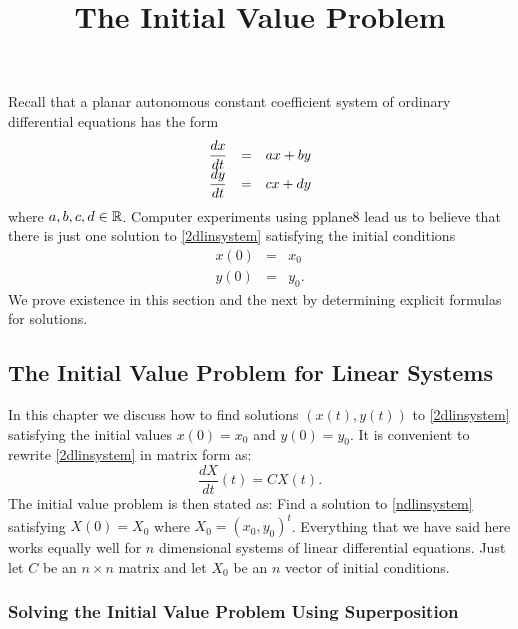 \documentclass{ximera}
\title{The Initial Value Problem}
\begin{document}
\begin{abstract}
\end{abstract}
\maketitle

\label{S:6.1}

Recall that a planar autonomous  constant coefficient system of
ordinary differential equations has the form
\arraystart
\begin{equation}  \label{2dlinsystem}
\begin{array}{ccl}
\displaystyle \frac{dx}{dt}  & = & ax+by \\
\displaystyle \frac{dy}{dt}  & = & cx+dy
\end{array}
\end{equation}
\arrayfinish
where $a,b,c,d\in\mbox{$\Bbb{R}$}$. Computer experiments using {\sf pplane8} lead us to
believe that there is just one solution to \eqref{2dlinsystem} satisfying
the initial conditions
\begin{eqnarray*}
x(0) & = & x_0 \\
y(0) & = & y_0.
\end{eqnarray*}
We prove existence in this section and the next by determining explicit 
formulas for solutions.  

\subsection*{The Initial Value Problem for Linear Systems}

In this chapter we discuss how to find solutions $(x(t),y(t))$ to
\eqref{2dlinsystem} satisfying the initial values $x(0)=x_0$ and $y(0)=y_0$.
It is convenient to rewrite \eqref{2dlinsystem} in matrix form as:
\begin{equation} \label{ndlinsystem}
\frac{dX}{dt}(t) = CX(t).
\end{equation}
The initial value problem is then stated as:  Find a solution to
\eqref{ndlinsystem} satisfying $X(0)=X_0$ where $X_0=(x_0,y_0)^t$.
Everything that we have said here works equally well for $n$
dimensional systems of linear differential equations.  Just let
$C$ be an $n\times n$ matrix and let $X_0$ be an $n$ vector
of initial conditions.

\subsubsection*{Solving the Initial Value Problem Using Superposition}
\end{document}

